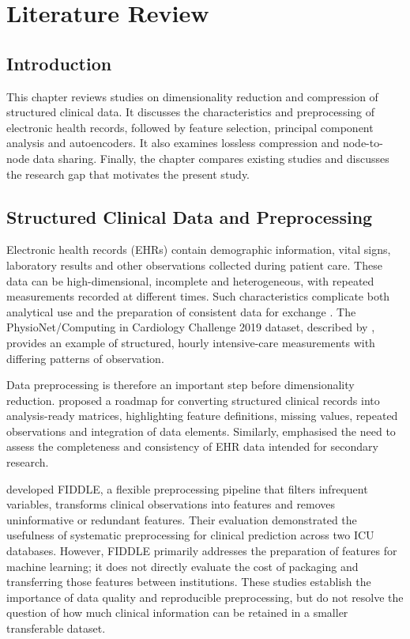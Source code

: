 \chapter{Literature Review}\label{chap:guide}
\section{Introduction}\label{introduction}

This chapter reviews studies on dimensionality reduction and compression of structured clinical data. It discusses the characteristics and preprocessing of electronic health records, followed by feature selection, principal component analysis and autoencoders. It also examines lossless compression and node-to-node data sharing. Finally, the chapter compares existing studies and discusses the research gap that motivates the present study.

\section{Structured Clinical Data and Preprocessing}\label{structured-clinical-data-and-preprocessing}

Electronic health records (EHRs) contain demographic information, vital
signs, laboratory results and other observations collected during
patient care. These data can be high-dimensional, incomplete and
heterogeneous, with repeated measurements recorded at different times.
Such characteristics complicate both analytical use and the preparation
of consistent data for exchange \citep{Shickel2018,Hong2018}. The
PhysioNet/Computing in Cardiology Challenge 2019 dataset, described by
\citet{Reyna2020}, provides an example of structured, hourly
intensive-care measurements with differing patterns of observation.

\noindent Data preprocessing is therefore an important step before dimensionality
reduction. \citet{Ferrao2016} proposed a roadmap for converting
structured clinical records into analysis-ready matrices, highlighting
feature definitions, missing values, repeated observations and
integration of data elements. Similarly, \citet{Kahn2016} emphasised the
need to assess the completeness and consistency of EHR data intended for
secondary research.

\noindent \citet{Tang2020} developed FIDDLE, a flexible preprocessing pipeline
that filters infrequent variables, transforms clinical observations into
features and removes uninformative or redundant features. Their
evaluation demonstrated the usefulness of systematic preprocessing for
clinical prediction across two ICU databases. However, FIDDLE primarily
addresses the preparation of features for machine learning; it does not
directly evaluate the cost of packaging and transferring those features
between institutions. These studies establish the importance of data
quality and reproducible preprocessing, but do not resolve the question
of how much clinical information can be retained in a smaller
transferable dataset.

